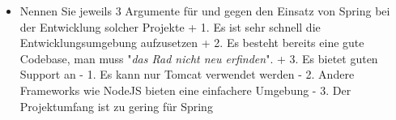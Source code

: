 \begin{itemize}
    \item Nennen Sie jeweils 3 Argumente für und gegen den Einsatz von Spring bei der Entwicklung solcher Projekte
        \subitem + 1. Es ist sehr schnell die Entwicklungsumgebung aufzusetzen
        \subitem + 2. Es besteht bereits eine gute Codebase, man muss "\textit{das Rad nicht neu erfinden}".
        \subitem + 3. Es bietet guten Support an
        \subitem - 1. Es kann nur Tomcat verwendet werden
        \subitem - 2. Andere Frameworks wie NodeJS bieten eine einfachere Umgebung
        \subitem - 3. Der Projektumfang ist zu gering für Spring
\end{itemize}
